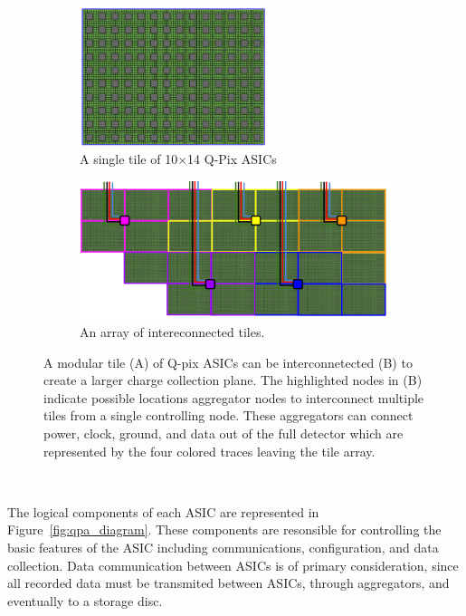 \begin{figure}
\centering
\begin{subfigure}{.5\textwidth}
  \centering
  \includegraphics[width=0.6\textwidth]{images/single_tile_qpix.png}
  \caption{A single tile of 10$\times$14 Q-Pix ASICs}
\end{subfigure}%
\begin{subfigure}{.5\textwidth}
  \centering
  \includegraphics[width=\textwidth]{images/array_of_tiles_qpix.png}
  \caption{An array of intereconnected tiles.}
\end{subfigure}
\caption{A modular tile (A) of Q-pix ASICs can be interconnetected (B) to create a larger charge collection plane. 
The highlighted nodes in (B) indicate possible locations aggregator nodes to interconnect multiple tiles from a single controlling node.
These aggregators can connect power, clock, ground, and data out of the full detector which are represented by the four colored traces leaving the tile array.
}
\end{figure}~\label{fig:qpix_tile_introduction}

The logical components of each ASIC are represented in Figure~\ref{fig:qpa_diagram}.
These components are resonsible for controlling the basic features of the ASIC including communications, configuration, and data collection.
Data communication between ASICs is of primary consideration, since all recorded data must be transmited between ASICs, through aggregators, and eventually to a storage disc.

